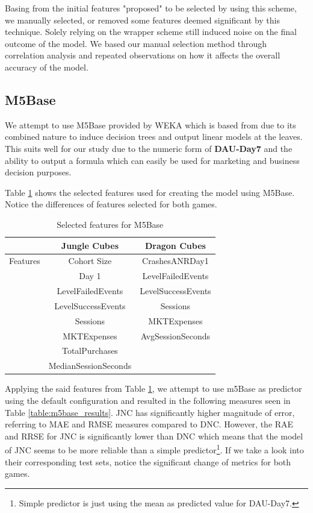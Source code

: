 Basing from the initial features "proposed" to be selected by using this scheme, we manually selected, or removed some features deemed significant by this technique. Solely relying on the wrapper scheme still induced noise on the final outcome of the model. We based our manual selection method through correlation analysis and repeated observations on how it affects the overall accuracy of the model.

\subsection{M5Base}
We attempt to use M5Base provided by WEKA which is based from \cite{ref:m5base} due to its combined nature to induce decision trees and output linear models at the leaves. This suits well for our study due to the numeric form of \textbf{DAU-Day7} and the ability to output a formula which can easily be used for marketing and business decision purposes.

Table \ref{table:m5base_features} shows the selected features used for creating the model using M5Base. Notice the differences of features selected for both games.
\begin{table}[h]
\centering
\caption{Selected features for M5Base}
\label{table:m5base_features}
\begin{tabular}{|c|c|c|}
\hline 
 & Jungle Cubes & Dragon Cubes\\ 
\hline 
Features & Cohort Size & CrashesANRDay1 
\\& Day 1 & LevelFailedEvents 
\\& LevelFailedEvents & LevelSuccessEvents
\\& LevelSuccessEvents & Sessions
\\& Sessions & MKTExpenses 
\\& MKTExpenses & AvgSessionSeconds 
\\& TotalPurchases & 
\\& MedianSessionSeconds &\\ 
\hline 

\end{tabular}
\end{table} 

Applying the said features from Table \ref{table:m5base_features}, we attempt to use m5Base as predictor using the default configuration and resulted in the following measures seen in Table \ref{table:m5base_results}. JNC has significantly higher magnitude of error, referring to MAE and RMSE measures compared to DNC. However, the RAE and RRSE for JNC is significantly lower than DNC which means that the model of JNC seems to be more reliable than a simple predictor\footnote{Simple predictor is just using the mean as predicted value for DAU-Day7.}. If we take a look into their corresponding test sets, notice the significant change of metrics for both games.

